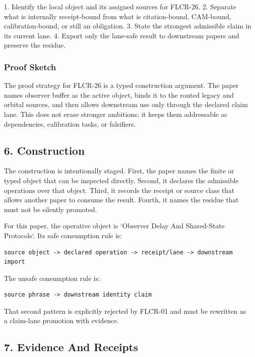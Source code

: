 \documentclass[11pt]{article}
\begin{document}
1. Identify the local object and its assigned sources for FLCR-26.
2. Separate what is internally receipt-bound from what is citation-bound, CAM-bound, calibration-bound, or still an obligation.
3. State the strongest admissible claim in its current lane.
4. Export only the lane-safe result to downstream papers and preserve the residue.

\subsubsection*{Proof Sketch}

The proof strategy for FLCR-26 is a typed construction argument. The paper names observer buffer as the active object, binds it to the routed legacy and orbital sources, and then allows downstream use only through the declared claim lane. This does not erase stronger ambitions; it keeps them addressable as dependencies, calibration tasks, or falsifiers.

\subsection*{6. Construction}

The construction is intentionally staged. First, the paper names the finite or
typed object that can be inspected directly. Second, it declares the admissible
operations over that object. Third, it records the receipt or source class that
allows another paper to consume the result. Fourth, it names the residue that
must not be silently promoted.

For this paper, the operative object is `Observer Delay And Shared-State Protocols`. Its safe consumption
rule is:

\begin{verbatim}
source object -> declared operation -> receipt/lane -> downstream import
\end{verbatim}

The unsafe consumption rule is:

\begin{verbatim}
source phrase -> downstream identity claim
\end{verbatim}

That second pattern is explicitly rejected by FLCR-01 and must be rewritten as
a claim-lane promotion with evidence.

\subsection*{7. Evidence And Receipts}
\end{document}
